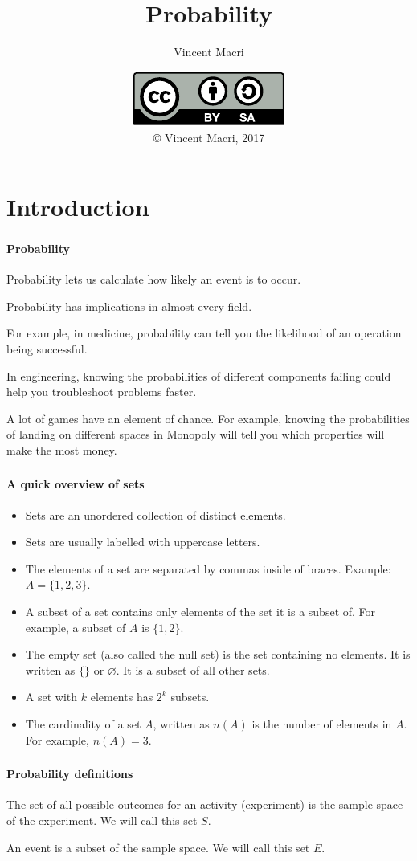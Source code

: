 \documentclass[mathserif]{beamer}
\title{Probability}
\author{Vincent Macri}
\date{\includegraphics{../LicenseLogo}\\\copyright{} Vincent Macri, 2017}
\newenvironment{namedframe}[1]%
	{\begin{frame}\frametitle{\secname}\framesubtitle{#1}}
	{\end{frame}}
\begin{document}
	\frame{\titlepage}
	\section{Introduction}
	\begin{namedframe}{Probability}
		Probability lets us calculate how likely an event is to occur.
		\pause

		Probability has implications in almost every field.  \pause

		For example, in medicine, probability can tell you the likelihood of an operation being successful.
		\pause

		In engineering, knowing the probabilities of different components failing could help you troubleshoot problems faster.
		\pause

		A lot of games have an element of chance. For example, knowing the probabilities of landing on different spaces in Monopoly will tell you which properties will make the most money.
	\end{namedframe}
	\begin{namedframe}{A quick overview of sets}
		\begin{itemize}[<+->]
			\item Sets are an \alert{unordered} collection of \alert{distinct} elements.
			\item Sets are usually labelled with uppercase letters.
			\item The elements of a set are separated by commas inside of braces. Example: $A = \{1,2,3\}$.
			\item A subset of a set contains only elements of the set it is a subset of. For example, a subset of $A$ is $\{1,2\}$.
			\item The empty set (also called the null set) is the set containing no elements. It is written as $\{\}$ or $\varnothing$. It is a subset of all other sets.
			\item A set with $k$ elements has $2^k$ subsets.
			\item The cardinality of a set $A$, written as $n(A)$ is the number of elements in $A$. For example, $n(A) = 3$.
		\end{itemize}
	\end{namedframe}
	\begin{namedframe}{Probability definitions}
		\begin{description}[<+->]
			\item[Sample space] The set of all possible outcomes for an activity (experiment) is the sample space of the experiment. We will call this set $S$.
			\item[Event] An event is a subset of the sample space. We will call this set $E$.
		\end{description}
	\end{namedframe}
\end{document}
